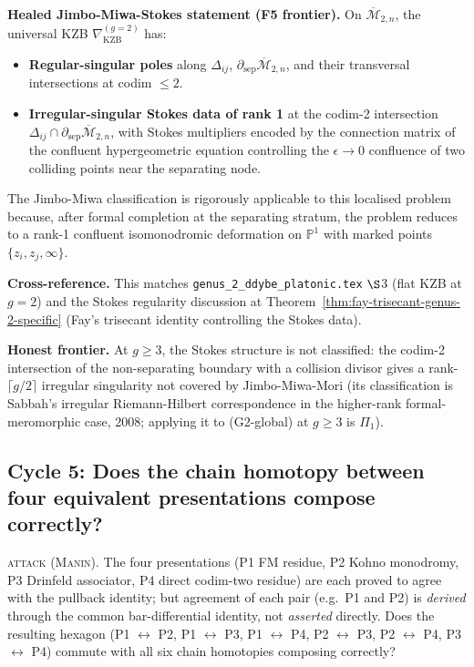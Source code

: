 \documentclass[12pt]{article}
\providecommand{\KZB}{\mathrm{KZB}}
\providecommand{\Mbar}{\overline{\mathcal{M}}}
\theoremstyle{definition}
\begin{document}
\textbf{Healed Jimbo-Miwa-Stokes statement (F5 frontier).}
On $\Mbar_{2,n}$, the universal KZB
$\nabla_{\KZB}^{(g=2)}$ has:
\begin{itemize}
\item \textbf{Regular-singular poles} along
  $\Delta_{ij}$, $\partial_{\mathrm{sep}}\Mbar_{2,n}$,
  and their transversal intersections at codim $\leq 2$.
\item \textbf{Irregular-singular Stokes data of rank 1} at
  the codim-2 intersection
  $\Delta_{ij} \cap \partial_{\mathrm{sep}}\Mbar_{2,n}$, with
  Stokes multipliers encoded by the connection matrix
  of the confluent hypergeometric equation controlling
  the $\epsilon \to 0$ confluence of two colliding points
  near the separating node.
\end{itemize}
The Jimbo-Miwa classification is rigorously applicable to this
localised problem because, after formal completion at the
separating stratum, the problem reduces to a rank-1 confluent
isomonodromic deformation on $\mathbb{P}^1$ with marked points
$\{z_i, z_j, \infty\}$.

\textbf{Cross-reference.}
This matches \texttt{genus\_2\_ddybe\_platonic.tex} $\S$3
(flat KZB at $g = 2$) and the Stokes regularity discussion
at Theorem~\ref{thm:fay-trisecant-genus-2-specific} (Fay's
trisecant identity controlling the Stokes data).

\textbf{Honest frontier.}
At $g \geq 3$, the Stokes structure is not classified:
the codim-2 intersection of the non-separating boundary with
a collision divisor gives a rank-$\lceil g/2 \rceil$
irregular singularity not covered by Jimbo-Miwa-Mori (its
classification is Sabbah's irregular Riemann-Hilbert
correspondence in the higher-rank formal-meromorphic case,
2008; applying it to (G2-global) at $g \geq 3$ is $\Pi_1$).

\subsection{Cycle 5: Does the chain homotopy between four
equivalent presentations compose correctly?}
\label{ssec:cycle-5}

\textsc{attack (Manin).}
The four presentations (P1 FM residue, P2 Kohno monodromy,
P3 Drinfeld associator, P4 direct codim-two residue) are
each proved to agree with the pullback identity; but agreement
of each pair (e.g.\ P1 and P2) is \emph{derived} through the
common bar-differential identity, not \emph{asserted}
directly.  Does the resulting hexagon
(P1 $\leftrightarrow$ P2, P1 $\leftrightarrow$ P3,
P1 $\leftrightarrow$ P4, P2 $\leftrightarrow$ P3,
P2 $\leftrightarrow$ P4, P3 $\leftrightarrow$ P4)
commute with all six chain homotopies composing correctly?
\end{document}
